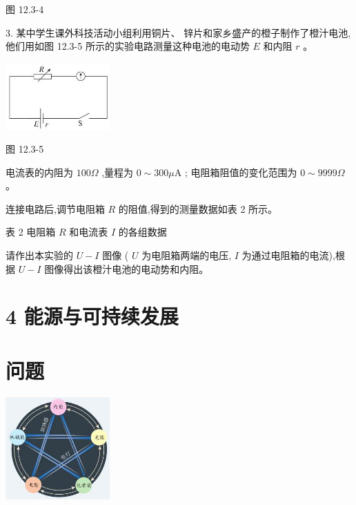 \documentclass[10pt]{article}
\begin{document}
图 12.3-4

3. 某中学生课外科技活动小组利用铜片、 锌片和家乡盛产的橙子制作了橙汁电池, 他们用如图 12.3-5 所示的实验电路测量这种电池的电动势 \(E\) 和内阻 \(r\) 。

\begin{center}
\includegraphics[max width=0.3\textwidth]{images/01911d5f-8e38-70c0-b5b8-2b399bd115b6_97_620850.jpg}
\end{center}

图 12.3-5

电流表的内阻为 \({100\Omega }\) ,量程为 \(0 \sim {300\mu }\mathrm{A}\) ; 电阻箱阻值的变化范围为 \(0 \sim {9999\Omega }\) 。

连接电路后,调节电阻箱 \(R\) 的阻值,得到的测量数据如表 2 所示。

表 2 电阻箱 \(R\) 和电流表 \(I\) 的各组数据

\begin{center}
\end{center}

请作出本实验的 \(U - I\) 图像 ( \(U\) 为电阻箱两端的电压, \(I\) 为通过电阻箱的电流),根据 \(U - I\) 图像得出该橙汁电池的电动势和内阻。

\section*{4 能源与可持续发展}

\section*{问题}

\begin{center}
\includegraphics[max width=0.3\textwidth]{images/01911d5f-8e38-70c0-b5b8-2b399bd115b6_98_972026.jpg}
\end{center}
\end{document}
